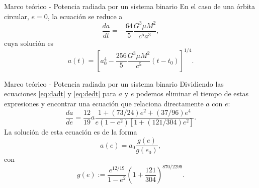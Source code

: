 \begin{frame}{Marco teórico - Potencia radiada por un sistema binario}
En el caso de una órbita circular, $e=0$, la ecuación se reduce a
\begin{equation}
\frac{da}{dt} = -\frac{64}{5}\frac{G^3\mu M^2}{c^5a^3},
\end{equation}
cuya solución es
\begin{equation}
a(t) = \left[a_0^4-\frac{256}{5}\frac{G^3\mu M^2}{c^5}(t-t_0)\right]^{1/4}.
\end{equation}
\end{frame}
\begin{frame}{Marco teórico - Potencia radiada por un sistema binario}
Dividiendo las ecuaciones \ref{eq:dadt} y \ref{eq:dedt} para $\dot{a}$ y $\dot{e}$ podemos eliminar el tiempo de estas expresiones y encontrar una ecuación que relaciona directamente $a$ con $e$:
\begin{equation}
\frac{da}{de}=\frac{12}{19}a\frac{1+(73/24)e^2+(37/96)e^4}{e(1-e^2)[1+(121/304)e^2]}.
\label{eq:dade}
\end{equation}
La solución de esta ecuación es de la forma
\begin{equation*}
a(e)=a_{0}\frac{g(e)}{g(e_{0})},
\end{equation*}
con 
\begin{equation*}
g(e):= \frac{e^{12/19}}{1-e^2}\left(1+\frac{121}{304} \right)^{870/2299}.
\end{equation*}
\end{frame}